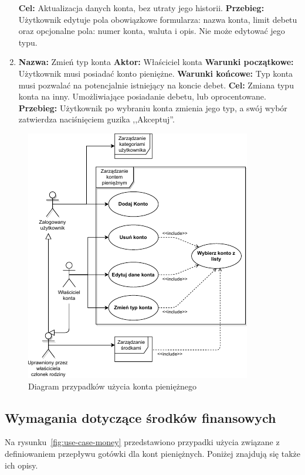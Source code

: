 \begin{enumerate}[labelwidth=1em,label=\arabic*.]
    \textbf{Cel:} Aktualizacja danych konta, bez utraty jego historii. \newline
    \textbf{Przebieg:} Użytkownik edytuje pola obowiązkowe formularza: nazwa konta, limit debetu oraz opcjonalne pola: numer konta, waluta i opis. Nie może edytować jego typu.
\item \label{last-item1}\textbf{Nazwa:} Zmień typ konta\newline
    \textbf{Aktor:} Właściciel konta \newline
    \textbf{Warunki początkowe:} Użytkownik musi posiadać konto pieniężne. \newline
    \textbf{Warunki końcowe:} Typ konta musi pozwalać na potencjalnie istniejący na koncie debet. \newline
    \textbf{Cel:} Zmiana typu konta na inny. Umożliwiające posiadanie debetu, lub oprocentowane. \newline
    \textbf{Przebieg:} Użytkownik po wybraniu konta zmienia jego typ, a swój wybór zatwierdza naciśnięciem guzika ,,Akceptuj''. 
\end{enumerate}

\begin{figure}[t]
	\centering
	\includegraphics[width=.65\linewidth]{rys03/use-case-account-2.pdf}
	\caption{Diagram przypadków użycia konta pieniężnego}
	\label{fig:use-case-account}
\end{figure}

\subsection{Wymagania dotyczące środków finansowych}
\label{subsec:wymagania-srodki-finansowe}
Na rysunku~\ref{fig:use-case-money} przedstawiono przypadki użycia związane z definiowaniem przepływu gotówki dla kont pieniężnych. Poniżej znajdują się także ich opisy.

